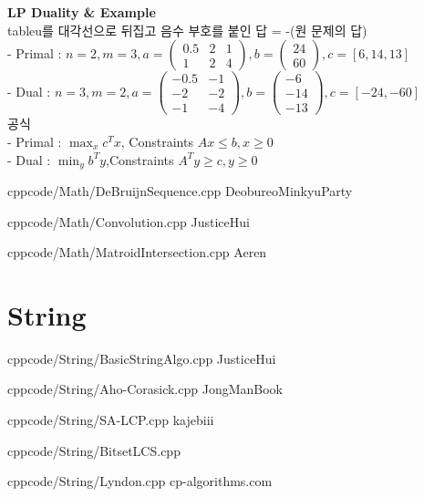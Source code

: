 \documentclass[landscape, 8pt, a4paper, oneside, twocolumn]{extarticle}
\begin{document}
\noindent
\textbf{LP Duality \& Example}\\
tableu를 대각선으로 뒤집고 음수 부호를 붙인 답 = -(원 문제의 답)\\
- Primal : $n = 2, m = 3, a = \begin{pmatrix} 0.5 & 2 & 1 \\ 1 & 2 & 4 \end{pmatrix}, b = \begin{pmatrix} 24 \\ 60 \end{pmatrix}, c = [6, 14, 13]$\\
- Dual : $n = 3, m = 2, a = \begin{pmatrix} -0.5 & -1 \\ -2 & -2 \\ -1 & -4 \end{pmatrix}, b = \begin{pmatrix} -6 \\ -14 \\ -13 \end{pmatrix}, c = [-24, -60]$\\
공식\\
- Primal : $\max_{x} c^Tx$, Constraints $Ax \leq b, x \geq 0$\\
- Dual : $\min_{y} b^Ty$,Constraints $A^Ty \geq c, y \geq 0$ 

{}{}
{cpp}{code/Math/DeBruijnSequence.cpp}
{DeobureoMinkyuParty}

{}{}
{cpp}{code/Math/Convolution.cpp}
{JusticeHui}

{}{}
{cpp}{code/Math/MatroidIntersection.cpp}
{Aeren}

\section{String}

{}{}
{cpp}{code/String/BasicStringAlgo.cpp}
{JusticeHui}

{}{}
{cpp}{code/String/Aho-Corasick.cpp}
{JongManBook}

{}{}
{cpp}{code/String/SA-LCP.cpp}
{kajebiii}

{}{}
{cpp}{code/String/BitsetLCS.cpp}

{}{}
{cpp}{code/String/Lyndon.cpp}
{cp-algorithms.com}
\end{document}
